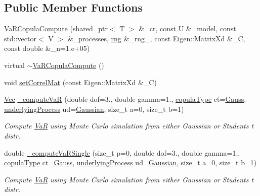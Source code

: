 \subsection*{Public Member Functions}
\begin{DoxyCompactItemize}
\item 
\hyperlink{classVaRCopulaCompute_a5e9c7b93130a65cbf5006fccb861c235}{Va\+R\+Copula\+Compute} (shared\+\_\+ptr$<$ T $>$ \&\+\_\+cr, const U \&\+\_\+model, const std\+::vector$<$ V $>$ \&\+\_\+processes, \hyperlink{classrng}{rng} \&\+\_\+rng\+\_\+, const Eigen\+::\+Matrix\+Xd \&\+\_\+C, const double \&\+\_\+n=1.e+05)
\item 
virtual \hyperlink{classVaRCopulaCompute_a3f31ae6973366895926f6b3ae11ef473}{$\sim$\+Va\+R\+Copula\+Compute} ()
\item 
void \hyperlink{classVaRCopulaCompute_a8263b7ec27286cee0a65019c9a90f51d}{set\+Correl\+Mat} (const Eigen\+::\+Matrix\+Xd \&\+\_\+C)
\item 
\hyperlink{compute__returns__eigen_8h_a1eb6a9306ef406d7975f3cbf2e247777}{Vec} \hyperlink{classVaRCopulaCompute_a367ca6f0e63ef6bb493d732435fc9b8d}{\+\_\+compute\+VaR} (double dof=3., double gamma=1., \hyperlink{rng_8h_aff2c6be1fded3d6d996b850e2eb87c25}{copula\+Type} ct=\hyperlink{rng_8h_aff2c6be1fded3d6d996b850e2eb87c25ab15a7891aa5223439e4692a1048cb220}{Gauss}, \hyperlink{mc__engine_8h_aeb3b337d49b67199ac031f705d206198}{underlying\+Process} ud=\hyperlink{mc__engine_8h_aeb3b337d49b67199ac031f705d206198aa11844f44df96808eb4e519ba04f088c}{Gaussian}, size\+\_\+t a=0, size\+\_\+t b=1)
\begin{DoxyCompactList}\small\item\em Compute \hyperlink{classVaR}{VaR} using Monte Carlo simulation from either Gaussian or Student\textquotesingle{}s t distr. \end{DoxyCompactList}\item 
double \hyperlink{classVaRCopulaCompute_a526b139c60a9f014b0e03eeae9d0f098}{\+\_\+compute\+Va\+R\+Single} (size\+\_\+t p=0, double dof=3., double gamma=1., \hyperlink{rng_8h_aff2c6be1fded3d6d996b850e2eb87c25}{copula\+Type} ct=\hyperlink{rng_8h_aff2c6be1fded3d6d996b850e2eb87c25ab15a7891aa5223439e4692a1048cb220}{Gauss}, \hyperlink{mc__engine_8h_aeb3b337d49b67199ac031f705d206198}{underlying\+Process} ud=\hyperlink{mc__engine_8h_aeb3b337d49b67199ac031f705d206198aa11844f44df96808eb4e519ba04f088c}{Gaussian}, size\+\_\+t a=0, size\+\_\+t b=1)
\begin{DoxyCompactList}\small\item\em Compute \hyperlink{classVaR}{VaR} using Monte Carlo simulation from either Gaussian or Student\textquotesingle{}s t distr. \end{DoxyCompactList}\item 

\end{DoxyCompactItemize}
